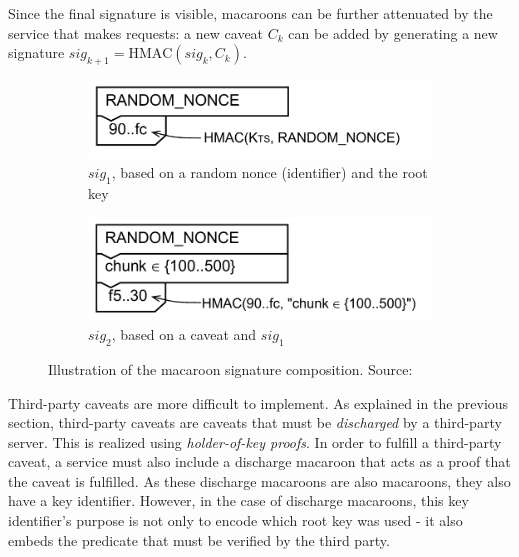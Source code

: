 Since the final signature is visible, macaroons can be further attenuated by the service that makes requests: a new caveat $C_k$ can be added by generating a new signature $sig_{k+1} = \text{HMAC}(sig_k, C_k)$. 

\begin{figure}[H]
     \centering
     \begin{subfigure}[b]{0.45\textwidth}
         \centering
         \includegraphics[width=\textwidth]{images/macaroons/basic-macaroon.png}
         \caption{$sig_1$, based on a random nonce (identifier) and the root key}
         \label{fig:macaroon-sig-1}
     \end{subfigure}
     \hfill
     \begin{subfigure}[b]{0.45\textwidth}
         \centering
         \includegraphics[width=\textwidth]{images/macaroons/macaroon-single-caveat.png}
         \caption{$sig_2$, based on a caveat and $sig_1$}
         \label{fig:macaroon-sig-2}
     \end{subfigure}
        \caption{Illustration of the macaroon signature composition. Source: \citet{macaroons}}
        \label{fig:macaroon-hash-chain}
\end{figure}

\setlength{\abovedisplayskip}{7pt}
\setlength{\belowdisplayskip}{7pt}

\noindent Third-party caveats are more difficult to implement. As explained in the previous section, third-party caveats are caveats that must be \textit{discharged} by a third-party server. This is realized using \textit{holder-of-key proofs}. In order to fulfill a third-party caveat, a service must also include a discharge macaroon that acts as a proof that the caveat is fulfilled. As these discharge macaroons are also macaroons, they also have a key identifier. However, in the case of discharge macaroons, this key identifier's purpose is not only to encode which root key was used - it also embeds the predicate that must be verified by the third party.

